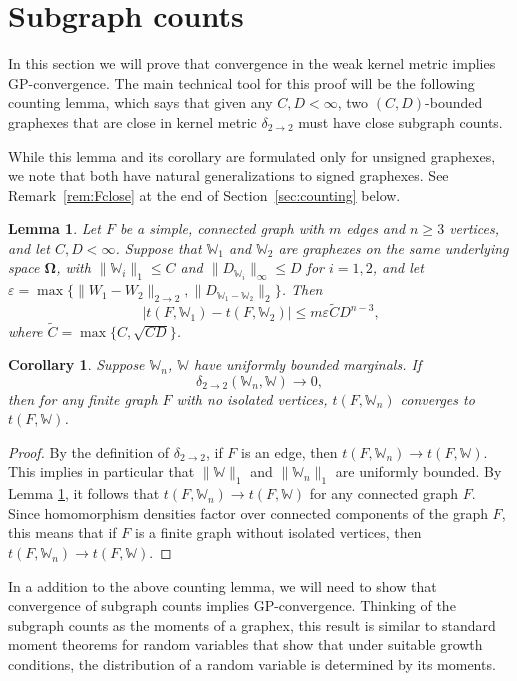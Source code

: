 \documentclass{amsart}
\numberwithin{equation}{section}
\numberwithin{figure}{section}
\newtheorem{lemma}[theorem]{Lemma}
\newtheorem{corollary}[theorem]{Corollary}
\theoremstyle{definition}
\theoremstyle{remark}
\newcommand{\bOmega}{{\mathbf{\Omega}}}
\newcommand{\cW}{\mathbb{W}}
\newcommand{\deltt}{\delta_{2\to 2}}
\begin{document}
\section{Subgraph counts}
\label{sec:subgraph-counts}

In this section we will prove that convergence in the weak kernel metric
implies GP-convergence. The main technical tool for this proof will be the
following counting lemma, which says that given any $C,D<\infty$, two
$(C,D)$-bounded graphexes that are close in kernel metric $\deltt$ must have
close subgraph counts.

While this lemma and its corollary are formulated only for unsigned
graphexes, we note that both have natural generalizations to signed
graphexes.  See Remark~\ref{rem:Fclose} at the end of
Section~\ref{sec:counting} below.

\begin{lemma} \label{lemmatFclose}
Let $F$ be a simple, connected graph with $m$ edges and $n\geq 3$ vertices,
and let $C,D <\infty$. Suppose that $\cW_1$ and $\cW_2$ are graphexes on the
same underlying space $\bOmega$, with $\|\cW_i\|_1 \le C$ and
$\|D_{{\cW}_i}\|_\infty \le D$ for $i=1,2$, and let
$\varepsilon=\max\{\|W_1-W_2\|_{2 \rightarrow 2},\|D_{\cW_1-\cW_2}\|_2\}$.
Then
\[\
|t(F,\cW_1)-t(F,\cW_2)| \le m\varepsilon \widetilde CD^{n-3},
\]
where $\widetilde C=\max\{C,\sqrt{CD}\}$.
\end{lemma}

\begin{corollary} \label{corrolaryFclose}
Suppose $\cW_n$, $\cW$ have uniformly bounded marginals.
If
\[
\deltt(\cW_n,\cW) \rightarrow 0,
\]
then for any finite graph $F$ with no isolated vertices, $t(F,\cW_n)$
converges to $t(F,\cW)$.
\end{corollary}

\begin{proof}
By the definition of $\deltt$, if $F$ is an edge, then $t(F,\cW_n)
\rightarrow t(F,\cW)$. This implies in particular that $\|\cW\|_1$ and
$\|\cW_n\|_1$ are uniformly bounded. By Lemma \ref{lemmatFclose}, it follows
that $t(F,\cW_n) \rightarrow t(F,\cW)$ for any connected graph $F$. Since
homomorphism densities factor over connected components of the graph $F$,
this means that if $F$ is a finite graph without isolated vertices, then
$t(F,\cW_n) \rightarrow t(F,\cW)$.
\end{proof}

In a addition to the above counting lemma, we will need to show that
convergence of subgraph counts implies GP-convergence. Thinking of the
subgraph counts as the moments of a graphex, this result is similar to
standard moment theorems for random variables that show that under suitable
growth conditions, the distribution of a random variable is determined by its
moments.
\end{document}
